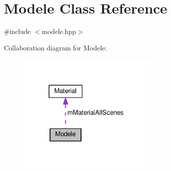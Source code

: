 \hypertarget{class_modele}{\section{Modele Class Reference}
\label{class_modele}
}


{\ttfamily \#include $<$modele.\+hpp$>$}



Collaboration diagram for Modele\+:
\nopagebreak
\begin{figure}[H]
\begin{center}
\leavevmode
\includegraphics[width=197pt]{class_modele__coll__graph}
\end{center}
\end{figure}
